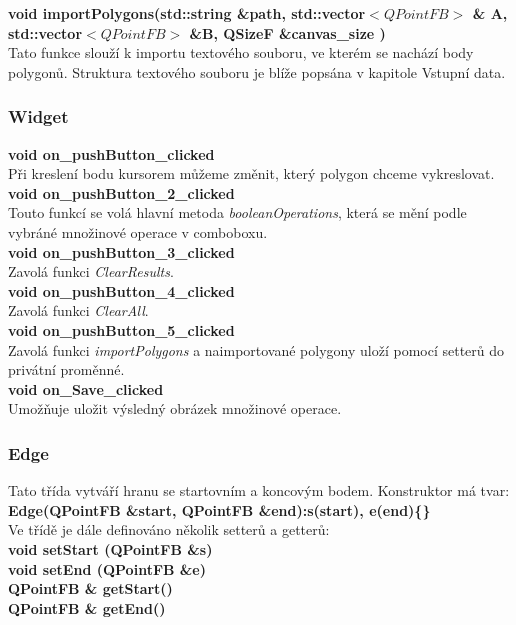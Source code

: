 \documentclass[a4paper,11pt,twoside]{article}
\begin{document}
\noindent\textbf{void importPolygons(std::string \&path,  std::vector$<QPointFB>$ \& A,  std::vector$<QPointFB>$ \&B, QSizeF \&canvas\_size )}\\
Tato funkce slouží k importu textového souboru, ve kterém se nachází body polygonů. Struktura textového souboru je blíže popsána v kapitole Vstupní data.

\subsubsection{Widget}
\noindent\textbf{void on\_pushButton\_clicked}\\
Při kreslení bodu kursorem můžeme změnit, který polygon chceme vykreslovat. \\

\noindent\textbf{void on\_pushButton\_2\_clicked}\\
Touto funkcí se volá hlavní metoda \textit{booleanOperations}, která se mění podle vybráné množinové operace v comboboxu.\\

\noindent\textbf{void on\_pushButton\_3\_clicked}\\
Zavolá funkci \textit{ClearResults}.\\

\noindent\textbf{void on\_pushButton\_4\_clicked}\\
Zavolá funkci \textit{ClearAll}.\\

\noindent\textbf{void on\_pushButton\_5\_clicked}\\
Zavolá funkci \textit{importPolygons} a naimportované polygony uloží pomocí setterů do privátní proměnné.\\

\noindent\textbf{void on\_Save\_clicked}\\
Umožňuje uložit výsledný obrázek množinové operace.

\newpage
\vspace*{-1cm}
\subsubsection{Edge}
Tato třída vytváří hranu se startovním a koncovým bodem. 
\noindent Konstruktor má tvar:\\
\noindent\textbf{Edge(QPointFB \&start, QPointFB \&end):s(start), e(end)\{\}}\\

\noindent Ve třídě je dále definováno několik setterů a getterů:\\
\noindent\textbf{void setStart (QPointFB \&s)}\\
\noindent\textbf{void setEnd  (QPointFB \&e)}\\
\noindent\textbf{QPointFB \& getStart()}\\
\noindent\textbf{QPointFB \& getEnd()}\\
\end{document}
